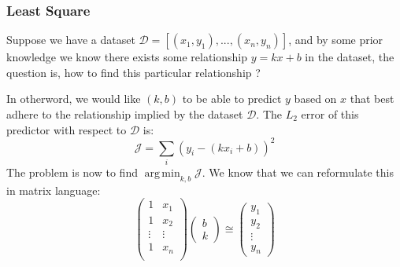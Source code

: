 \subsubsection{Least Square}

%
\providecommand{\argmin}{\operatorname*{arg\,min}}%
\providecommand{\argmax}{\operatorname*{arg\,max}}%
Suppose we have a dataset $\mathcal D = [(x_1,y_1),...,(x_n, y_n)]$, and by some prior knowledge we know there exists some relationship $y=kx + b$ in the dataset, the question is, how to find this particular relationship ?

In otherword, we would like $(k,b)$ to be able to predict $y$ based on $x$ that best adhere to the relationship implied by the dataset $\mathcal D$. The $L_2$ error of this predictor with respect to $\mathcal D$ is:
\begin{equation}
\mathcal J =\sum_i (y_i-(kx_i+b))^2
\end{equation}
The problem is now to find $\argmin_{k,b} \mathcal J$. We know that we can reformulate this in matrix language:
\begin{equation}
\begin{pmatrix}
1 & x_1 \\
1 & x_2 \\
\vdots &\vdots \\
1 & x_n \\
\end{pmatrix}
\begin{pmatrix}
b \\ k
\end{pmatrix}
\cong 
\begin{pmatrix}
y_1 \\
y_2 \\
\vdots \\
y_n
\end{pmatrix}
\end{equation}